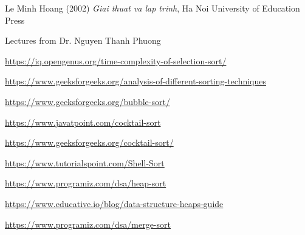 \documentclass[12pt,a4paper]{article}
\begin{document}
\newpage
\begin{thebibliography}{9}
Le Minh Hoang (2002) \emph{Giai thuat va lap trinh}, Ha Noi University of Education Press

Lectures from Dr. Nguyen Thanh Phuong

\url{https://iq.opengenus.org/time-complexity-of-selection-sort/}

\url{https://www.geeksforgeeks.org/analysis-of-different-sorting-techniques}

\url{https://www.geeksforgeeks.org/bubble-sort/}

\url{https://www.javatpoint.com/cocktail-sort}

\url{https://www.geeksforgeeks.org/cocktail-sort/}

\url{https://www.tutorialspoint.com/Shell-Sort}

\url{https://www.programiz.com/dsa/heap-sort}

\url{https://www.educative.io/blog/data-structure-heaps-guide}

\url{https://www.programiz.com/dsa/merge-sort}

\end{thebibliography}
\end{document}
